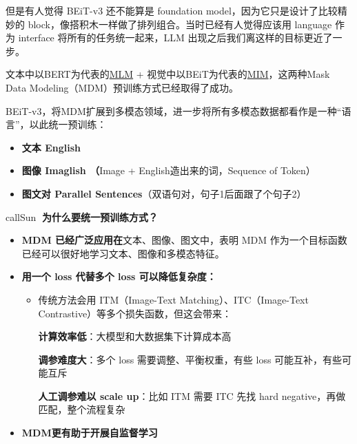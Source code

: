 \documentclass[zihao=false,fontset=windows]{ctexart}
\newcommand{\rb}[1]{\textcolor{feishuRed}{\textbf{#1}}}
\begin{document}
\textcolor{feishuBlue}{但是有人觉得 BEiT-v3 还不能算是 foundation model，因为它只是设计了比较精妙的 block，像搭积木一样做了排列组合。当时已经有人觉得应该用 language 作为 interface 将所有的任务统一起来，LLM 出现之后我们离这样的目标更近了一步。}\par

\par\vspace{1.15em}\par\vspace{0.28em}

文本中以BERT为代表的\href{https://scnajei2ds6y.feishu.cn/wiki/U5sZwCwKwivERwktFWvcdM50nkf\#C7YrdlkjHoRWhVxE5BicV7xNnjJ}{MLM} + 视觉中以BEiT为代表的\href{https://scnajei2ds6y.feishu.cn/wiki/Dab8wydhtii0tpk1RXvcMJ8Vnoc\#GaUYdY7iVo8Qtexy6CEc6XaGn3f}{MIM}，这两种Mask Data Modeling（MDM）预训练方式已经取得了成功。\par

BEiT-v3，将MDM扩展到多模态领域，进一步将所有多模态数据都看作是一种“语言”，以此统一预训练：\par
\begin{itemize}
\item \textbf{文本 English}
\item \textbf{图像 Imaglish （}Image + English造出来的词，Sequence of Token）
\item \textbf{图文对 Parallel Sentences}（双语句对，句子1后面跟了个句子2）
\end{itemize}

\begin{feishubox}{callSun}{🙋}
\rb{为什么要统一预训练方式？}\par
\begin{itemize}
\item \textbf{MDM 已经广泛应用在}文本、图像、图文中，表明 MDM 作为一个目标函数已经可以很好地学习文本、图像和多模态特征。
\item \textbf{用一个 loss 代替多个 loss 可以降低复杂度：}
\begin{itemize}
\item 传统方法会用 ITM（Image-Text Matching）、ITC（Image-Text Contrastive）等多个损失函数，但这会带来：
\par
\textbf{计算效率低}：大模型和大数据集下计算成本高
\par
\textbf{调参难度大}：多个 loss 需要调整、平衡权重，有些 loss 可能互补，有些可能互斥
\par
\textbf{人工调参难以 scale up}：比如 ITM 需要 ITC 先找 hard negative，再做匹配，整个流程复杂
\end{itemize}
\item \textbf{MDM更有助于开展自监督学习}
\end{itemize}
\end{feishubox}
\end{document}
